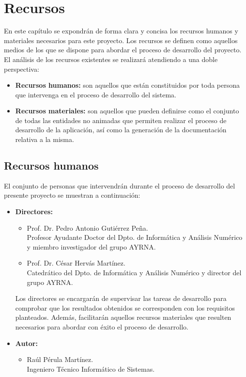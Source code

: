 \chapter{Recursos}
	
	En este capítulo se expondrán de forma clara y concisa los recursos humanos y materiales necesarios para este proyecto. Los recursos se definen como aquellos medios de los que se dispone para abordar el proceso de desarrollo del proyecto. El análisis de los recursos existentes se realizará atendiendo a una doble perspectiva:
	
	\begin{itemize}
		\item \textbf{Recursos humanos:} son aquellos que están constituidos por toda persona que intervenga en el proceso de desarrollo del sistema.
		\item \textbf{Recursos materiales:} son aquellos que pueden definirse como el conjunto de todas las entidades no animadas que permiten realizar el proceso de desarrollo de la aplicación, así como la generación de la documentación relativa a la misma.
	\end{itemize}
	
	\section{Recursos humanos}
	
		El conjunto de personas que intervendrán durante el proceso de desarrollo del presente proyecto se muestran a continuación:
	
		\begin{itemize}
			\item \textbf{Directores:}
			\begin{itemize}
				\item Prof. Dr. Pedro Antonio Gutiérrez Peña.\\
	
				Profesor Ayudante Doctor del Dpto. de Informática y Análisis Numérico y miembro investigador del grupo AYRNA.
	
				\item Prof. Dr. César Hervás Martínez.\\

				Catedrático del Dpto. de Informática y Análisis Numérico y director del grupo AYRNA.
			\end{itemize}
			
			Los directores se encargarán de supervisar las tareas de desarrollo para comprobar que los resultados obtenidos se corresponden con los requisitos planteados. Además, facilitarán aquellos recursos materiales que resulten necesarios para abordar con éxito el proceso de desarrollo.
		
			\item \textbf{Autor:}
			\begin{itemize}
				\item Raúl Pérula Martínez.\\
	
				Ingeniero Técnico Informático de Sistemas.
			\end{itemize}
		\end{itemize}
	
